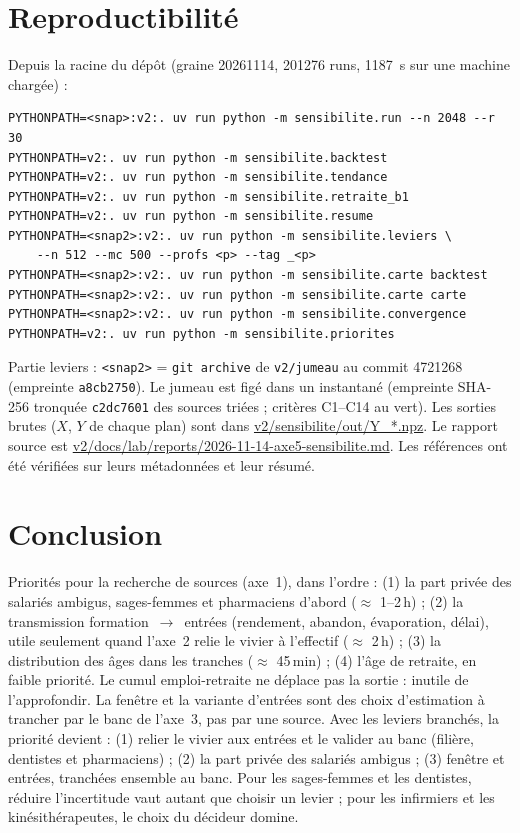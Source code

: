 \section{Reproductibilité}
Depuis la racine du dépôt (graine \num{20261114}, \num{201276} runs, \SI{1187}{\second}\mesure{} sur une machine chargée) :
\begin{verbatim}
PYTHONPATH=<snap>:v2:. uv run python -m sensibilite.run --n 2048 --r 30
PYTHONPATH=v2:. uv run python -m sensibilite.backtest
PYTHONPATH=v2:. uv run python -m sensibilite.tendance
PYTHONPATH=v2:. uv run python -m sensibilite.retraite_b1
PYTHONPATH=v2:. uv run python -m sensibilite.resume
PYTHONPATH=<snap2>:v2:. uv run python -m sensibilite.leviers \
    --n 512 --mc 500 --profs <p> --tag _<p>
PYTHONPATH=<snap2>:v2:. uv run python -m sensibilite.carte backtest
PYTHONPATH=<snap2>:v2:. uv run python -m sensibilite.carte carte
PYTHONPATH=<snap2>:v2:. uv run python -m sensibilite.convergence
PYTHONPATH=v2:. uv run python -m sensibilite.priorites
\end{verbatim}
Partie leviers : \texttt{<snap2>} = \texttt{git archive} de \texttt{v2/jumeau} au commit 4721268 (empreinte
\texttt{a8cb2750}).
Le jumeau est figé dans un instantané (empreinte SHA-256 tronquée \texttt{c2dc7601} des sources triées ; critères C1--C14 au vert). Les sorties brutes ($X$, $Y$ de chaque plan) sont dans \url{v2/sensibilite/out/Y_*.npz}. Le rapport source est \url{v2/docs/lab/reports/2026-11-14-axe5-sensibilite.md}. Les références ont été vérifiées sur leurs
métadonnées et leur résumé.

\section{Conclusion}
Priorités pour la recherche de sources (axe~1), dans l'ordre : (1) la part privée des salariés ambigus,
sages-femmes et pharmaciens d'abord ($\approx$ 1--2\,h\suppose{}) ; (2) la transmission formation~$\to$~entrées
(rendement, abandon, évaporation, délai), utile seulement quand l'axe~2 relie le vivier à l'effectif
($\approx$ 2\,h\suppose{}) ; (3) la distribution des âges dans les tranches ($\approx$ 45\,min\suppose{}) ;
(4) l'âge de retraite, en faible priorité. Le cumul emploi-retraite ne déplace pas la sortie : inutile de
l'approfondir. La fenêtre et la variante d'entrées sont des choix d'estimation à trancher par le banc de
l'axe~3, pas par une source. Avec les leviers branchés, la priorité devient : (1) relier le vivier aux entrées et le valider au
banc (filière, dentistes et pharmaciens) ; (2) la part privée des salariés ambigus ; (3) fenêtre et entrées,
tranchées ensemble au banc. Pour les sages-femmes et les dentistes, réduire l'incertitude vaut autant que choisir
un levier ; pour les infirmiers et les kinésithérapeutes, le choix du décideur domine.


